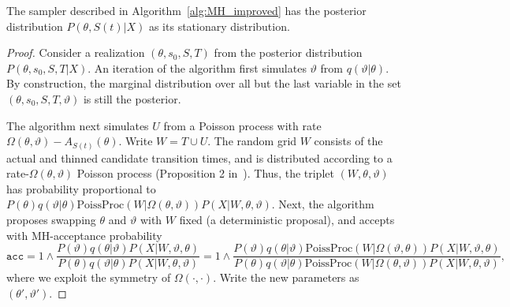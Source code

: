 \begin{proposition}
  The sampler described in Algorithm~\ref{alg:MH_improved} has the posterior distribution $P(\theta,S(t)|X)$ as its stationary distribution.
\end{proposition}
\begin{proof}
  Consider a realization $(\theta,s_0,S,T)$ from the posterior distribution $P(\theta, s_0, S, T|X)$. An iteration of the algorithm first simulates $\vartheta$ from $q(\vartheta|\theta)$. By construction, the marginal distribution over all but the last variable in the set $(\theta, s_0, S, T, \vartheta)$ is still the posterior.

  The algorithm next simulates $U$ from a Poisson process with rate $\Omega(\theta,\vartheta) - A_{S(t)}(\theta)$. Write $W = T \cup U$.
  The random grid $W$ consists of the actual and thinned candidate transition times, and is distributed according to a rate-$\Omega(\theta, \vartheta)$ Poisson process (Proposition 2 in~\cite{RaoTeh13}). 
  Thus, the triplet $(W,\theta,\vartheta)$ has probability proportional to $P(\theta)q(\vartheta|\theta)\text{PoissProc}(W|\Omega(\theta,\vartheta)) P(X|W,\theta,\vartheta)$.
  Next, the algorithm proposes swapping $\theta$ and $\vartheta$ with $W$ fixed (a deterministic proposal), and accepts with MH-acceptance probability 
  $$\texttt{acc} = 
  1 \wedge \frac{P(\vartheta)q(\theta|\vartheta)
P(X|W,\vartheta,\theta)}{P(\theta)q(\vartheta|\theta)
P(X|W,\theta,\vartheta)} =
1 \wedge \frac{P(\vartheta)q(\theta|\vartheta)\text{PoissProc}(W|\Omega(\vartheta,\theta)) P(X|W,\vartheta,\theta)}{P(\theta)q(\vartheta|\theta)\text{PoissProc}(W|\Omega(\theta,\vartheta))
P(X|W,\theta,\vartheta)},$$
where we exploit the symmetry of $\Omega(\cdot,\cdot)$.
Write the new parameters as $(\theta', \vartheta')$. 


\end{proof}
